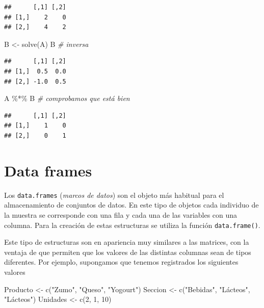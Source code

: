 \documentclass[
]{book}
\newenvironment{Shaded}{\begin{snugshade}}{\end{snugshade}}
\newcommand{\CommentTok}[1]{\textcolor[rgb]{0.56,0.35,0.01}{\textit{#1}}}
\newcommand{\DecValTok}[1]{\textcolor[rgb]{0.00,0.00,0.81}{#1}}
\newcommand{\FunctionTok}[1]{\textcolor[rgb]{0.00,0.00,0.00}{#1}}
\newcommand{\NormalTok}[1]{#1}
\newcommand{\OtherTok}[1]{\textcolor[rgb]{0.56,0.35,0.01}{#1}}
\newcommand{\SpecialCharTok}[1]{\textcolor[rgb]{0.00,0.00,0.00}{#1}}
\newcommand{\StringTok}[1]{\textcolor[rgb]{0.31,0.60,0.02}{#1}}
\theoremstyle{break}
\theoremstyle{nonumberplain}
\begin{document}
\begin{verbatim}
##      [,1] [,2]
## [1,]    2    0
## [2,]    4    2
\end{verbatim}

\begin{Shaded}
\begin{Highlighting}[]
\NormalTok{B }\OtherTok{\textless{}{-}} \FunctionTok{solve}\NormalTok{(A)}
\NormalTok{B  }\CommentTok{\# inversa}
\end{Highlighting}
\end{Shaded}

\begin{verbatim}
##      [,1] [,2]
## [1,]  0.5  0.0
## [2,] -1.0  0.5
\end{verbatim}

\begin{Shaded}
\begin{Highlighting}[]
\NormalTok{A }\SpecialCharTok{\%*\%}\NormalTok{ B  }\CommentTok{\# comprobamos que está bien}
\end{Highlighting}
\end{Shaded}

\begin{verbatim}
##      [,1] [,2]
## [1,]    1    0
## [2,]    0    1
\end{verbatim}

\hypertarget{data-frames}{%
\section{Data frames}\label{data-frames}}

Los \texttt{data.frames} (\emph{marcos de datos}) son el objeto más habitual para el almacenamiento de conjuntos de datos.
En este tipo de objetos cada individuo de la muestra se corresponde con una fila y cada una de las variables con una columna.
Para la creación de estas estructuras se utiliza la función \texttt{data.frame()}.

Este tipo de estructuras son en apariencia muy similares a las matrices, con la ventaja de que permiten que los valores de las distintas columnas sean de tipos diferentes.
Por ejemplo, supongamos que tenemos registrados los siguientes valores

\begin{Shaded}
\begin{Highlighting}[]
\NormalTok{Producto }\OtherTok{\textless{}{-}} \FunctionTok{c}\NormalTok{(}\StringTok{"Zumo"}\NormalTok{, }\StringTok{"Queso"}\NormalTok{, }\StringTok{"Yogourt"}\NormalTok{)}
\NormalTok{Seccion }\OtherTok{\textless{}{-}} \FunctionTok{c}\NormalTok{(}\StringTok{"Bebidas"}\NormalTok{, }\StringTok{"Lácteos"}\NormalTok{, }\StringTok{"Lácteos"}\NormalTok{)}
\NormalTok{Unidades }\OtherTok{\textless{}{-}} \FunctionTok{c}\NormalTok{(}\DecValTok{2}\NormalTok{, }\DecValTok{1}\NormalTok{, }\DecValTok{10}\NormalTok{)}
\end{Highlighting}
\end{Shaded}
\end{document}
